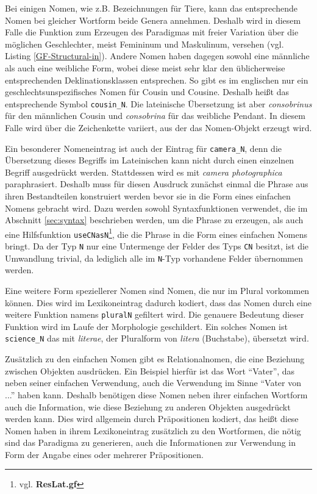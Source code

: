 Bei einigen Nomen, wie z.B. Bezeichnungen für Tiere, kann das entsprechende Nomen bei gleicher Wortform beide Genera annehmen. Deshalb wird in diesem Falle die Funktion zum Erzeugen des Paradigmas mit freier Variation über die möglichen Geschlechter, meist Femininum und Maskulinum, versehen (vgl. Listing \ref{GF-Structural-in}). Andere Nomen haben dagegen sowohl eine männliche als auch eine weibliche Form, wobei diese meist sehr klar den üblicherweise entsprechenden Deklinationsklassen entsprechen. So gibt es im englischen nur ein geschlechtsunspezifisches Nomen für Cousin und Cousine. Deshalb heißt das entsprechende Symbol \texttt{cousin\_N}. Die lateinische Übersetzung ist aber \textit{consobrinus} für den männlichen Cousin und \textit{consobrina} für das weibliche Pendant. In diesem Falle wird über die Zeichenkette variiert, aus der das Nomen-Objekt erzeugt wird.\par 
Ein besonderer Nomeneintrag ist auch der Eintrag für \texttt{camera\_N}, denn die Übersetzung dieses Begriffs im Lateinischen kann nicht durch einen einzelnen Begriff ausgedrückt werden. Stattdessen wird es mit \textit{camera photographica} paraphrasiert. Deshalb muss für diesen Ausdruck zunächst einmal die Phrase aus ihren Bestandteilen konstruiert werden bevor sie in die Form eines einfachen Nomens gebracht wird. Dazu werden sowohl Syntaxfunktionen verwendet, die im Abschnitt  \ref{sec:syntax} beschrieben werden, um die Phrase zu erzeugen, als auch eine Hilfsfunktion \texttt{useCNasN}\footnote{vgl. \textbf{ResLat.gf}}, die die Phrase in die Form eines einfachen Nomens bringt. Da der Typ \texttt{N} nur eine Untermenge der Felder des Typs \texttt{CN} besitzt, ist die Umwandlung trivial, da lediglich alle im \texttt{N}-Typ vorhandene Felder übernommen werden.\par
Eine weitere Form speziellerer Nomen sind Nomen, die nur im Plural vorkommen können. Dies wird im Lexikoneintrag dadurch kodiert, dass das Nomen durch eine weitere Funktion namens \texttt{pluralN} gefiltert wird. Die genauere Bedeutung dieser Funktion wird im Laufe der Morphologie geschildert. Ein solches Nomen ist \texttt{science\_N} das mit \textit{literae}, der Pluralform von \textit{litera} (Buchstabe), übersetzt wird. \par
Zusätzlich zu den einfachen Nomen gibt es Relationalnomen, die eine Beziehung zwischen Objekten ausdrücken. Ein Beispiel hierfür ist das Wort "`Vater"', das neben seiner einfachen Verwendung, auch die Verwendung im Sinne ``Vater von ...'' haben kann. Deshalb benötigen diese Nomen neben ihrer einfachen Wortform auch die Information, wie diese Beziehung zu anderen Objekten ausgedrückt werden kann. Dies wird allgemein durch Präpositionen kodiert, das heißt diese Nomen haben in ihrem Lexikoneintrag zusätzlich zu den Wortformen, die nötig sind das Paradigma zu generieren, auch die Informationen zur Verwendung in Form der Angabe eines oder mehrerer Präpositionen. \par
